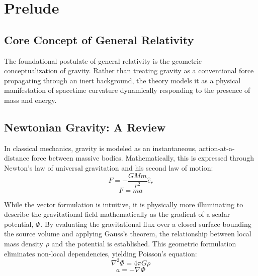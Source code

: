 \documentclass[11pt, a4paper]{report}
\begin{document}
\section{Prelude}

\subsection*{Core Concept of General Relativity}
The foundational postulate of general relativity is the geometric conceptualization of gravity. Rather than treating gravity as a conventional force propagating through an inert background, the theory models it as a physical manifestation of spacetime curvature dynamically responding to the presence of mass and energy.

\subsection*{Newtonian Gravity: A Review}
In classical mechanics, gravity is modeled as an instantaneous, action-at-a-distance force between massive bodies. Mathematically, this is expressed through Newton's law of universal gravitation and his second law of motion:
\begin{equation}\label{eq:newton-force}
F = - \frac{GMm}{r^2} \hat{e}_r
\end{equation}
\begin{equation}\label{eq:newton-second}
F = ma
\end{equation}

While the vector formulation is intuitive, it is physically more illuminating to describe the gravitational field mathematically as the gradient of a scalar potential, $\Phi$. By evaluating the gravitational flux over a closed surface bounding the source volume and applying Gauss's theorem, the relationship between local mass density $\rho$ and the potential is established. This geometric formulation eliminates non-local dependencies, yielding Poisson's equation:
\begin{equation}\label{eq:poisson}
\nabla^2 \Phi = 4\pi G \rho
\end{equation}
\begin{equation}\label{eq:potential-accel}
a = -\nabla \Phi
\end{equation}
\end{document}
